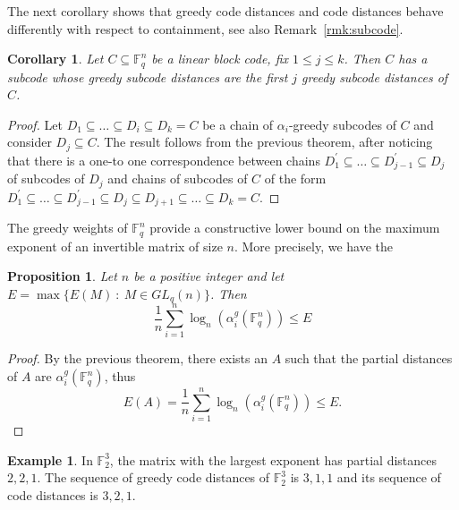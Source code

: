 \documentclass[12pt]{amsart}
\numberwithin{equation}{section}
\newtheorem{proposition}[theorem]{Proposition}
\newtheorem{corollary}[theorem]{Corollary}
\theoremstyle{definition}
\newtheorem{example}[theorem]{Example}
\newcommand{\FF}{\mathbb{F}}
\begin{document}
The next corollary shows that greedy code distances and code distances behave differently with respect to containment, see also Remark~\ref{rmk:subcode}.

\begin{corollary}
Let $C\subseteq\FF_q^n$ be a linear block code, fix $1\leq j\leq k$. Then $C$ has a subcode whose greedy subcode distances are the first $j$ greedy subcode distances of $C$.
\end{corollary}

\begin{proof}
Let $D_1\subseteq\ldots\subseteq D_i\subseteq D_k=C$ be a chain of $\alpha_i$-greedy subcodes of $C$ and consider $D_j\subseteq C$.
The result follows from the previous theorem, after noticing that there is a one-to one correspondence between chains $D_1^\prime\subseteq\ldots\subseteq D_{j-1}^\prime \subseteq D_j$  of subcodes of $D_j$ and chains of subcodes of $C$ of the form $D_1^\prime\subseteq\ldots\subseteq D_{j-1}^\prime \subseteq D_j\subseteq D_{j+1}\subseteq\ldots\subseteq D_k=C$.
\end{proof}

The greedy weights of $\mathbb{F}_q^n$ provide a constructive lower bound on the maximum exponent of an invertible matrix of size $n$. More precisely, we have the

\begin{proposition}
    Let $n$ be a positive integer and let $E=\max\{E(M)\ :\ M\in GL_q(n)\}$. Then 
    $$\frac{1}{n}\sum_{i=1}^n\log_n(\alpha_i^g(\mathbb{F}_q^n))\leq E$$
\end{proposition}

\begin{proof}
By the previous theorem, there exists an $A$ such that the partial distances of $A$ are $\alpha_i^g(\mathbb{F}_q^n)$, thus
    $$E(A)=\frac{1}{n}\sum_{i=1}^n\log_n(\alpha_i^g(\mathbb{F}_q^n))\leq E.$$
\end{proof}


\begin{example}
In $\mathbb{F}_2^3$, the matrix with the largest exponent has partial distances $2,2,1$. The sequence of greedy code distances of $\FF_2^3$ is $3,1,1$ and its sequence of code distances is $3,2,1$.
\end{example}
\end{document}
